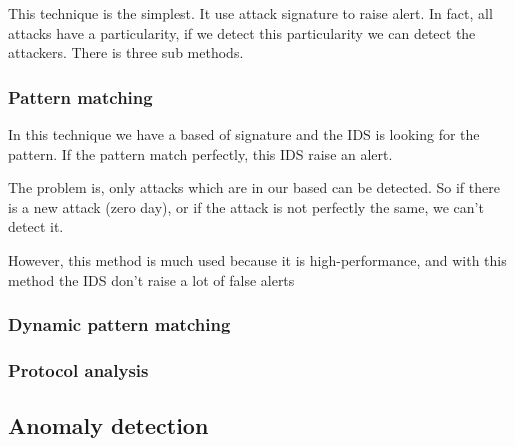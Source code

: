 This technique is the simplest. It use attack signature to raise alert. In fact,
all attacks have a particularity, if we detect this particularity we can detect
the attackers. There is three sub methods.

\subsubsection{Pattern matching}

In this technique we have a based of signature and the IDS is looking for the
pattern. If the pattern match perfectly, this IDS raise an alert.

The problem is, only attacks which are in our based can be detected. So if there
is a new attack (zero day), or if the attack is not perfectly the same, we can't
detect it.

However, this method is much used because it is high-performance, and with this
method the IDS don't raise a lot of false alerts

\subsubsection{Dynamic pattern matching}

\subsubsection{Protocol analysis}






\subsection{Anomaly detection}






